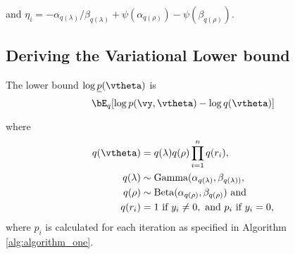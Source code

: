 \noindent and $\eta_i = - \alpha_{q(\lambda)}/\beta_{q(\lambda)} + \psi(\alpha_{q(\rho)}) - \psi(\beta_{q(\rho)})$.
%
%
%
%
%
%
%
%
%


\subsection{Deriving the Variational Lower bound}
The lower bound $\log{\underline{p}(\vtheta)}$ is
$$
\bE_q[\log{p(\vy, \vtheta)} - \log{q(\vtheta)}]
$$

\noindent where
\begin{align*}
	q(\vtheta) &= q(\lambda) q(\rho) \prod_{i=1}^n q(r_i), \\
	q(\lambda) &\sim \text{Gamma}{(\alpha_{q(\lambda)}, \beta_{q(\lambda))}}, \\
	q(\rho) &\sim \text{Beta}(\alpha_{q(\rho)}, \beta_{q(\rho)}) \text{ and } \\
	q(r_i) &= 1 \text{ if } y_i \ne 0,\text{ and } p_i \text{ if } y_i = 0,
\end{align*}
where $p_i$ is calculated for each iteration as specified in Algorithm \ref{alg:algorithm_one}.

